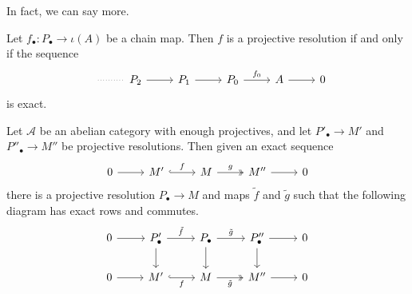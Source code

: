 \documentclass[main.tex]{subfiles}
\begin{document}
In fact, we can say more.

\begin{lemma}
  \label{lemma:equivalent_characterization_of_projective_resolution}
  Let $f_{\bullet}\colon P_{\bullet} \to \iota(A)$ be a chain map. Then $f$ is a projective resolution if and only if the sequence
  \begin{equation*}
    \begin{tikzcd}
      \
      \arrow[r, dotted, no head]
      & P_{2}
      \arrow[r]
      & P_{1}
      \arrow[r]
      & P_{0}
      \arrow[r, "f_{0}"]
      & A
      \arrow[r]
      & 0
    \end{tikzcd}
  \end{equation*}
  is exact.
\end{lemma}

\begin{theorem}
  \label{thm:horseshoe_lemma}
  Let $\mathcal{A}$ be an abelian category with enough projectives, and let $P'_{\bullet} \to M'$ and $P''_{\bullet} \to M''$ be projective resolutions. Then given an exact sequence
  \begin{equation*}
    \begin{tikzcd}
      0
      \arrow[r]
      & M'
      \arrow[r, hook, "f"]
      & M
      \arrow[r, two heads, "g"]
      & M''
      \arrow[r]
      & 0
    \end{tikzcd}
  \end{equation*}
  there is a projective resolution $P_{\bullet} \to M$ and maps $\tilde{f}$ and $\tilde{g}$ such that the following diagram has exact rows and commutes.
  \begin{equation*}
    \begin{tikzcd}
      0
      \arrow[r]
      & P'_{\bullet}
      \arrow[r, "\tilde{f}"]
      \arrow[d]
      & P_{\bullet}
      \arrow[r, "\tilde{g}"]
      \arrow[d]
      & P''_{\bullet}
      \arrow[r]
      \arrow[d]
      & 0
      \\
      0
      \arrow[r]
      & M'
      \arrow[r, swap, hook, "f"]
      & M
      \arrow[r, swap, two heads, "\tilde{g}"]
      & M''
      \arrow[r]
      & 0
    \end{tikzcd}
  \end{equation*}
\end{theorem}
\end{document}
